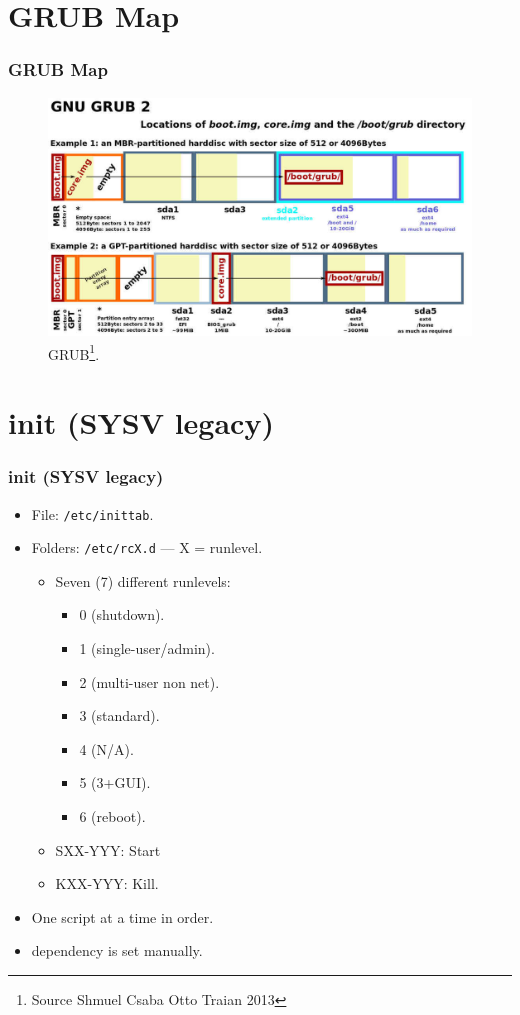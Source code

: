 \documentclass[xcolor=table, notheorems, hyperref={pdfpagelabels=false}]{beamer}
\begin{document}
\section{GRUB Map}
\begin{frame}
\frametitle{GRUB Map}
\begin{figure}
\includegraphics[width=0.8\linewidth]{os03-Shmuel-Csaba-Otto-Traian-2013-GRUB.jpg}
\caption{GRUB\footnote{Source Shmuel Csaba Otto Traian 2013}.}
\end{figure}
\end{frame}

\section{init (SYSV legacy)}
\begin{frame}
\frametitle{init (SYSV legacy)}
\begin{itemize}
\item File: \texttt{/etc/inittab}.
\item Folders: \texttt{/etc/rcX.d} --- X = runlevel.
\begin{itemize}
\item Seven (7) different runlevels: 
\begin{itemize}
\item 0 (shutdown).
\item 1 (single-user/admin).
\item 2 (multi-user non net).
\item 3 (standard).
\item 4 (N/A).
\item 5 (3+GUI).
\item 6 (reboot).
\end{itemize}
\item SXX-YYY: Start
\item KXX-YYY: Kill.
\end{itemize}
\item One script at a time in order.
\item dependency is set manually.
\end{itemize}
\end{frame}
\end{document}
